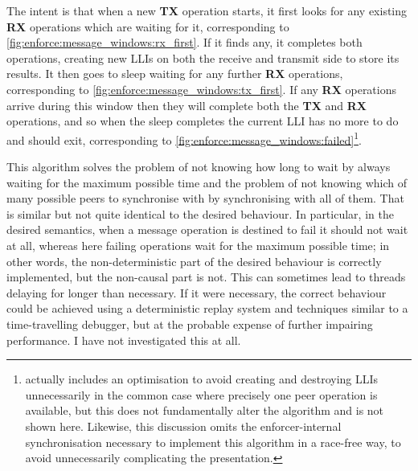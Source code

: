 The intent is that when a new \textbf{TX} operation starts, it first
looks for any existing \textbf{RX} operations which are waiting for
it, corresponding to \autoref{fig:enforce:message_windows:rx_first}.
If it finds any, it completes both operations, creating new LLIs on
both the receive and transmit side to store its results.  It then goes
to sleep waiting for any further \textbf{RX} operations, corresponding
to \autoref{fig:enforce:message_windows:tx_first}.  If any \textbf{RX}
operations arrive during this window then they will complete both the
\textbf{TX} and \textbf{RX} operations, and so when the sleep
completes the current LLI has no more to do and should exit,
corresponding to
\autoref{fig:enforce:message_windows:failed}\footnote{{\Implementation}
  actually includes an optimisation to avoid creating and destroying
  LLIs unnecessarily in the common case where precisely one peer
  operation is available, but this does not fundamentally alter the
  algorithm and is not shown here.  Likewise, this discussion omits
  the enforcer-internal synchronisation necessary to implement this
  algorithm in a race-free way, to avoid unnecessarily complicating
  the presentation.}.

This algorithm solves the problem of not knowing how long to wait by
always waiting for the maximum possible time and the problem of not
knowing which of many possible peers to synchronise with by
synchronising with all of them.  That is similar but not quite
identical to the desired behaviour.  In particular, in the desired
semantics, when a message operation is destined to fail it should not
wait at all, whereas here failing operations wait for the maximum
possible time; in other words, the non-deterministic part of the
desired behaviour is correctly implemented, but the non-causal part is
not.  This can sometimes lead to threads delaying for longer than
necessary.  If it were necessary, the correct behaviour could be
achieved using a deterministic replay system\cite{Choi1998} and
techniques similar to a time-travelling debugger\cite{Xu2003}, but at
the probable expense of further impairing performance.  I have not
investigated this at all.

